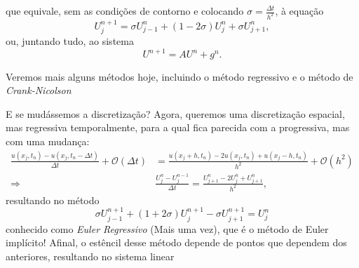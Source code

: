 \documentclass[../differential_methods.tex]{subfiles}
\begin{document}
que equivale, sem as condições de contorno e colocando \(\sigma  = \frac{\Delta t }{h^{2}}\), à equação
\[
	U_{j}^{n+1} = \sigma U_{j-1}^{n} + (1-2\sigma )U_{j}^{n} + \sigma U_{j+1}^{n},
\]
ou, juntando tudo, ao sistema
\[
	U_{}^{n+1} = A U^{n} + g^{n}.
\]

Veremos mais alguns métodos hoje, incluindo o método regressivo e o método de \textit{Crank-Nicolson}

E se mudássemos a discretização? Agora, queremos uma discretização espacial, mas regressiva temporalmente, para a qual fica parecida com a progressiva, mas com uma mudança:
\begin{align*}
	\frac{u(x_{j}, t_{n})-u(x_{j}, t_{n}-\Delta  t)}{\Delta  t}+ \mathcal{O}(\Delta t) & = \frac{u(x_{j}+h, t_{n})-2u(x_{j}, t_{n}) + u(x_{j} -h, t_{n})}{h^{2}}+\mathcal{O}(h^{2}) \\
	\Rightarrow                                                                        & \frac{U_{j}^{n}-U_{j}^{n-1}}{\Delta t} = \frac{U_{j+1}^{n}-2U_{j}^{n}+U_{j+1}^{n}}{h^{2}},
\end{align*}
resultando no método
\[
	\boxed{\sigma U_{j-1}^{n+1} + (1+2\sigma )U_{j}^{n+1}-\sigma U_{j+1}^{n+1} = U_{j}^{n}}
\]
conhecido como \textit{Euler Regressivo} (Mais uma vez), que é o método de Euler implícito! Afinal, o estêncil desse método depende de pontos que dependem dos anteriores, resultando no sistema linear
\end{document}
